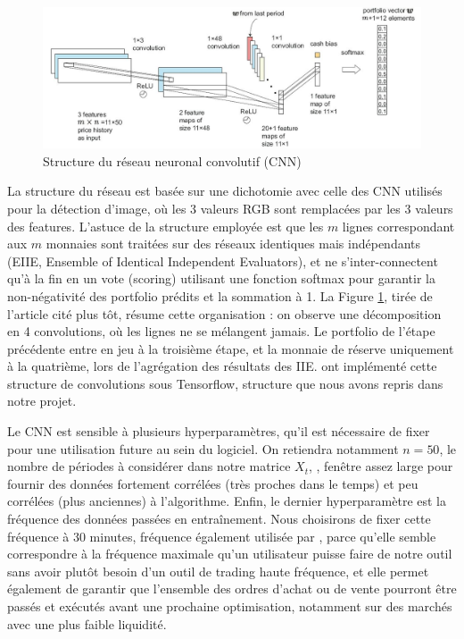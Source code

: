\documentclass[a4paper, 10pt]{article}
\begin{document}
\begin{figure}[ht!]
\begin{center}
\includegraphics[width=1.0\textwidth]{images/structure.JPG}
\caption{Structure du réseau neuronal convolutif (CNN)}
\label{fig:structure}
\end{center}
\end{figure}

La structure du réseau est basée sur une dichotomie avec celle des CNN utilisés pour la détection d'image, où les 3 valeurs RGB sont remplacées par les 3 valeurs des features. L'astuce de la structure employée est que les $m$ lignes correspondant aux $m$ monnaies sont traitées sur des réseaux identiques mais indépendants (EIIE, Ensemble of Identical Independent Evaluators), et ne s'inter-connectent qu'à la fin en un vote (scoring) utilisant une fonction softmax pour garantir la non-négativité des portfolio prédits et la sommation à 1. La Figure \ref{fig:structure}, tirée de l'article cité plus tôt, résume cette organisation : on observe une décomposition en 4 convolutions, où les lignes ne se mélangent jamais. Le portfolio de l'étape précédente entre en jeu à la troisième étape, et la monnaie de réserve uniquement à la quatrième, lors de l'agrégation des résultats des IIE. \citet{Jiang2017} ont implémenté cette structure de convolutions sous Tensorflow, structure que nous avons repris dans notre projet.

Le CNN est sensible à plusieurs hyperparamètres, qu'il est nécessaire de fixer pour une utilisation future au sein du logiciel. On retiendra notamment $n = 50$, le nombre de périodes à considérer dans notre matrice $X_t$, , fenêtre assez large pour fournir des données fortement corrélées (très proches dans le temps) et peu corrélées (plus anciennes) à l'algorithme. Enfin, le dernier hyperparamètre est la fréquence des données passées en entraînement. Nous choisirons de fixer cette fréquence à 30 minutes, fréquence également utilisée par \citet{Jiang2017}, parce qu'elle semble correspondre à la fréquence maximale qu'un utilisateur puisse faire de notre outil sans avoir plutôt besoin d'un outil de trading haute fréquence, et elle permet également de garantir que l'ensemble des ordres d'achat ou de vente pourront être passés et exécutés avant une prochaine optimisation, notamment sur des marchés avec une plus faible liquidité.
\end{document}
